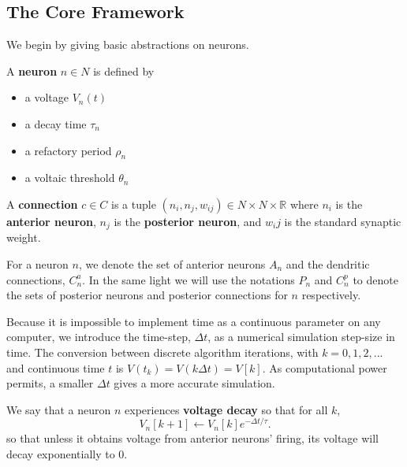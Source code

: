 \subsection{The Core Framework}

We begin by giving basic abstractions on neurons.

\begin{definition}\label{neuron}
	A \textbf{neuron} $n \in N$ is defined by
	\begin{itemize}
		\item a voltage $V_n(t)$
		\item a decay time $\tau_n$
		\item a refactory period $\rho_n$
		\item a voltaic threshold $\theta_n$
	\end{itemize}
\end{definition}
\begin{definition}\label{connection}
	A \textbf{connection} $c \in C$ is a tuple $(n_i, n_j, w_{ij}) \in N \times N \times \mathbb{R}$
	where $n_i$ is  the \textbf{anterior neuron}, $n_j$ is the \textbf{posterior neuron}, and $w_ij$
	is the standard synaptic weight.
\end{definition}



For a neuron $n$, we denote the set of anterior neurons $A_n$ and the dendritic connections, $C_{n}^a$. In the same light we will use the notations $P_n$ and $C_n^p$ to denote the sets of posterior neurons and posterior connections for $n$ respectively.

Because it is impossible to implement time as a continuous parameter on any computer, we introduce the time-step, $\Delta t$, as a numerical simulation step-size in time. The conversion between discrete algorithm iterations, with $k = 0, 1, 2, ...$ and continuous time $t$ is $V(t_{k}) = V(k\Delta t) = V[k]$. As computational power permits, a smaller $\Delta t$ gives a more accurate simulation.

\begin{definition}\label{decay}
	We say that a neuron $n$ experiences \textbf{voltage decay} so that for all $k$,
	\begin{equation}
		V_n[k+1] \leftarrow V_n[k]e^{-\Delta t/\tau}. \label{eq:decay}
	\end{equation}
	so that unless it obtains voltage from anterior neurons' firing, its voltage will decay exponentially to 0.
\end{definition}


